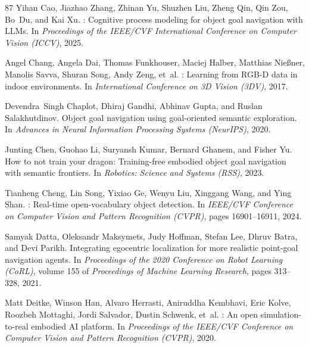 \documentclass[10pt]{article}
\begin{document}
\begin{thebibliography}{87}
Yihan Cao, Jiazhao Zhang, Zhinan Yu, Shuzhen Liu, Zheng Qin, Qin Zou, Bo~Du, and Kai Xu.
: Cognitive process modeling for object goal navigation with {LLMs}.
\newblock In \emph{Proceedings of the IEEE/CVF International Conference on Computer Vision (ICCV)}, 2025.

Angel Chang, Angela Dai, Thomas Funkhouser, Maciej Halber, Matthias Nie{\ss}ner, Manolis Savva, Shuran Song, Andy Zeng, et~al.
: Learning from {RGB-D} data in indoor environments.
\newblock In \emph{International Conference on 3D Vision (3DV)}, 2017.

Devendra~Singh Chaplot, Dhiraj Gandhi, Abhinav Gupta, and Ruslan Salakhutdinov.
\newblock Object goal navigation using goal-oriented semantic exploration.
\newblock In \emph{Advances in Neural Information Processing Systems (NeurIPS)}, 2020.

Junting Chen, Guohao Li, Suryansh Kumar, Bernard Ghanem, and Fisher Yu.
\newblock How to not train your dragon: Training-free embodied object goal navigation with semantic frontiers.
\newblock In \emph{Robotics: Science and Systems (RSS)}, 2023.

Tianheng Cheng, Lin Song, Yixiao Ge, Wenyu Liu, Xinggang Wang, and Ying Shan.
: Real-time open-vocabulary object detection.
\newblock In \emph{IEEE/CVF Conference on Computer Vision and Pattern Recognition (CVPR)}, pages 16901--16911, 2024.

Samyak Datta, Oleksandr Maksymets, Judy Hoffman, Stefan Lee, Dhruv Batra, and Devi Parikh.
\newblock Integrating egocentric localization for more realistic point-goal navigation agents.
\newblock In \emph{Proceedings of the 2020 Conference on Robot Learning (CoRL)}, volume 155 of \emph{Proceedings of Machine Learning Research}, pages 313--328, 2021.

Matt Deitke, Winson Han, Alvaro Herrasti, Aniruddha Kembhavi, Eric Kolve, Roozbeh Mottaghi, Jordi Salvador, Dustin Schwenk, et~al.
: An open simulation-to-real embodied {AI} platform.
\newblock In \emph{Proceedings of the IEEE/CVF Conference on Computer Vision and Pattern Recognition (CVPR)}, 2020.


\end{thebibliography}
\end{document}
